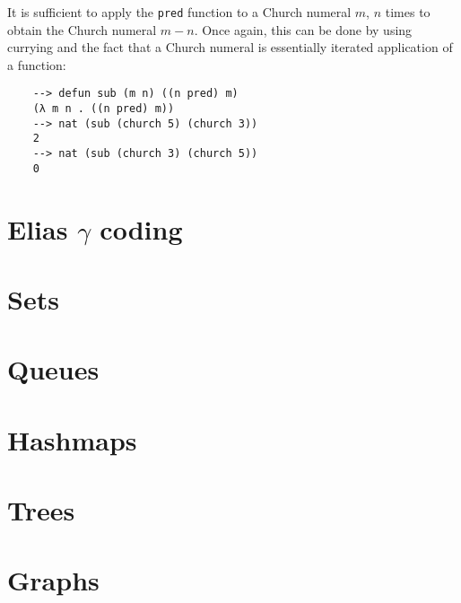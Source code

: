It is sufficient to apply the \verb|pred| function to a Church numeral $m$, $n$ times to obtain the Church numeral $m - n$. Once again, this can be done by using currying and the fact that a Church numeral is essentially iterated application of a function:

\begin{Verbatim}
    --> defun sub (m n) ((n pred) m)
    (λ m n . ((n pred) m))
    --> nat (sub (church 5) (church 3))
    2
    --> nat (sub (church 3) (church 5))
    0
\end{Verbatim}

\section{Elias \texorpdfstring{$\gamma$}{gamma} coding}

\section{Sets}

\section{Queues}

\section{Hashmaps}

\section{Trees}

\section{Graphs}
